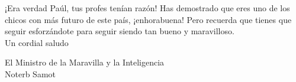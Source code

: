 \documentclass[svgnames,addpoints]{exam}
\begin{document}
\vspace*{1.6cm}

\begin{center}
  
    \begin{minipage}{13cm}

    ¡Era verdad Paúl, tus profes tenían razón! Has demostrado que eres uno de los chicos con más futuro de este país, ¡enhorabuena! Pero recuerda que tienes que seguir esforzándote para seguir siendo tan bueno y maravilloso.\\ 

    Un cordial saludo

    \vspace*{1.5cm}

    El Ministro de la  Maravilla y la Inteligencia\\
    Noterb Samot

    \end{minipage}
\end{center}
\end{document}
